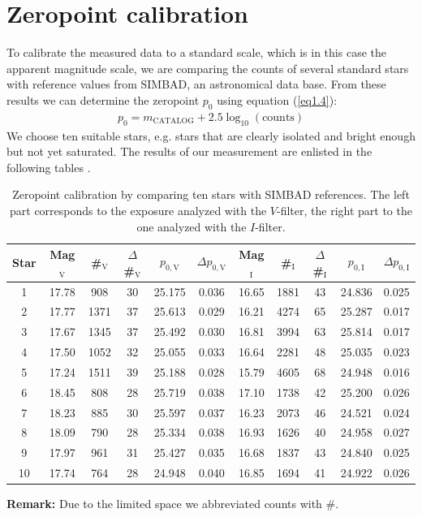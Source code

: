 \section{Zeropoint calibration}\label{sec:zeropoint}
To calibrate the measured data to a standard scale, which is in this case the apparent magnitude scale, we are comparing the counts of several standard stars with reference values from SIMBAD, an astronomical data base. From these results we can determine the zeropoint $p_0$ using equation (\ref{eq1.4}): 
	\begin{align*}
		p_0 = m_{\text{CATALOG}} + 2.5\log_{10}(\text{counts})
	\end{align*}
	We choose ten suitable stars, e.g. stars that are clearly isolated and bright enough but not yet saturated. 
\newpage
The results of our measurement are enlisted in the following tables
.
	
	\begin{table}[H]
\setlength{\tabcolsep}{2mm}
\renewcommand{\arraystretch}{1.5}
\begin{adjustbox}{width=\textwidth} 
\begin{tabular}{|c|c c c c c|c c c c c|}
\hline
Star & Mag$_{\text{V}}$ & \#$_{\text{V}}$ & $\Delta$\#$_{\text{V}}$ & $p_{0,\text{V}}$ &$\Delta p_{0,\text{V}}$ & Mag$_{\text{I}}$ & \#$_{\text{I}}$ & $\Delta$\#$_{\text{I}}$ & $p_{0,\text{I}}$ &$\Delta p_{0,\text{I}}$\\ \hline 
1 & 17.78 & 908 & 30 & 25.175 & 0.036 & 16.65 & 1881 & 43 & 24.836 & 0.025 \\
2 & 17.77 & 1371 & 37 & 25.613 & 0.029 & 16.21 & 4274 & 65 & 25.287 & 0.017 \\
3 & 17.67 & 1345 & 37 & 25.492 & 0.030 & 16.81 & 3994 & 63 & 25.814 & 0.017 \\
4 & 17.50 & 1052 & 32 & 25.055 & 0.033 & 16.64 & 2281 & 48 & 25.035 & 0.023 \\
5 & 17.24 & 1511 & 39 & 25.188& 0.028 & 15.79 & 4605 & 68 & 24.948 & 0.016 \\
6 & 18.45 & 808 & 28 & 25.719 & 0.038 & 17.10 & 1738 & 42 &  25.200 & 0.026 \\
7 & 18.23 & 885 & 30 & 25.597 & 0.037 & 16.23 & 2073 & 46 &  24.521 & 0.024 \\
8 & 18.09 & 790 & 28 & 25.334 & 0.038 & 16.93 & 1626 & 40 & 24.958 & 0.027 \\
9 & 17.97 & 961 & 31 & 25.427 & 0.035 & 16.68 & 1837 & 43 &  24.840 & 0.025 \\
10 & 17.74 & 764 & 28 & 24.948 & 0.040 & 16.85 &  1694 & 41 & 24.922 & 0.026 \\
\hline
\end{tabular}
\end{adjustbox}
\caption{\label{tab:2} Zeropoint calibration by comparing ten stars with SIMBAD references. The left part corresponds to the exposure analyzed with the $V$-filter, the right part to the one analyzed with the $I$-filter.}
\end{table}
\textbf{Remark:} Due to the limited space we abbreviated counts with $\#$. \\
	
